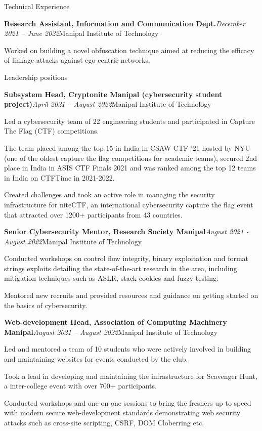 \documentclass{resume} %
\begin{document}
\begin{rSection}{Technical Experience}
\begin{rSubsection}{\bf Research Assistant, Information and Communication Dept.}{\em December 2021 -- June 2022}{Manipal Institute of Technology}{}
\item Worked on building a novel obfuscation technique aimed at reducing the efficacy of linkage attacks against ego-centric networks.
\end{rSubsection}
\begin{rSection}{Leadership positions}
\begin{rSubsection}{\bf Subsystem Head, Cryptonite Manipal (cybersecurity student project)}{\em April 2021 -- August 2022}{Manipal Institute of Technology}{}
\item Led a cybersecurity team of 22 engineering students and participated in Capture The Flag (CTF) competitions. 
\item The team placed among the top 15 in India in CSAW CTF '21 hosted by NYU (one of the oldest capture the flag competitions for academic teams), secured 2nd place in India in ASIS CTF Finals 2021 and was ranked among the top 12 teams in India on CTFTime in 2021-2022.
\item Created challenges and took an active role in managing the security infrastructure for niteCTF, an international cybersecurity capture the flag event that attracted over 1200+ participants from 43 countries.
\end{rSubsection}
\begin{rSubsection}{\bf Senior Cybersecurity Mentor, Research Society Manipal}{\em August 2021 - August 2022}{Manipal Institute of Technology}{}
\item Conducted workshops on control flow integrity, binary exploitation and format strings exploits detailing the state-of-the-art research in the area, including mitigation techniques such as ASLR, stack cookies and fuzzy testing.
\item Mentored new recruits and provided resources and guidance on getting started on the basics of cybersecurity.
\end{rSubsection}
\end{rSection}
\begin{rSubsection}{\bf Web-development Head, Association of Computing Machinery Manipal}{\em August 2021 -- August 2022}{Manipal Institute of Technology}{}
\item Led and mentored a team of 10 students who were actively involved in building and maintaining websites for events conducted by the club.
\item Took a lead in developing and maintaining the infrastructure for Scavenger Hunt, a inter-college event with over 700+ participants.
\item Conducted workshops and one-on-one sessions to bring the freshers up to speed with modern secure web-development standards demonstrating web security attacks such as cross-site scripting, CSRF, DOM Cloberring etc.
\end{rSubsection}
\end{rSection}
\end{document}
